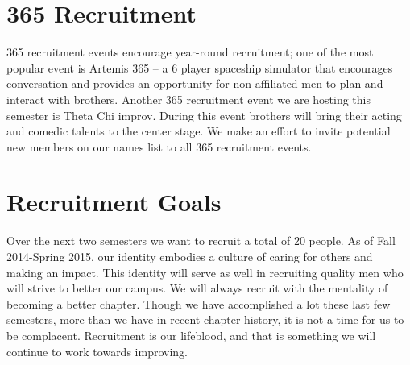   \section*{365 Recruitment}
    365 recruitment events encourage year-round recruitment; one of the most popular event is Artemis 365 – a 6 player spaceship simulator that encourages conversation and provides an opportunity for non-affiliated men to plan and interact with brothers. Another 365 recruitment event we are hosting this semester is Theta Chi improv. During this event brothers will bring their acting and comedic talents to the center stage. We make an effort to invite potential new members on our names list to all 365 recruitment events.
    
  \section*{Recruitment Goals}
    Over the next two semesters we want to recruit a total of 20 people. As of Fall 2014-Spring 2015, our identity embodies a culture of caring for others and making an impact. This identity will serve as well in recruiting quality men who will strive to better our campus. We will always recruit with the mentality of becoming a better chapter. Though we have accomplished a lot these last few semesters, more than we have in recent chapter history, it is not a time for us to be complacent. Recruitment is our lifeblood, and that is something we will continue to work towards improving.